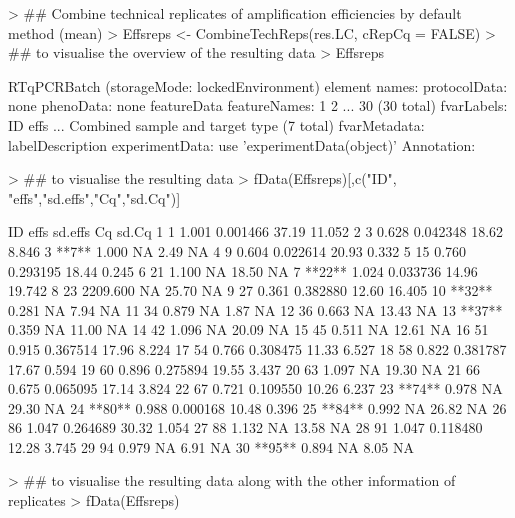 \documentclass[11pt]{article}
\begin{document}
\begin{Schunk}
\begin{Sinput}
> ## Combine technical replicates of amplification efficiencies by default method (mean)
> Effsreps <- CombineTechReps(res.LC, cRepCq = FALSE)
> ## to visualise the overview of the resulting data
> Effsreps 
\end{Sinput}
\begin{Soutput}
RTqPCRBatch (storageMode: lockedEnvironment)
  element names:  
protocolData: none
phenoData: none
featureData
  featureNames: 1 2 ... 30 (30 total)
  fvarLabels: ID effs ... Combined sample and target type (7 total)
  fvarMetadata: labelDescription
experimentData: use 'experimentData(object)'
Annotation:  
\end{Soutput}
\begin{Sinput}
> ## to visualise the resulting data
> fData(Effsreps)[,c("ID", "effs","sd.effs","Cq","sd.Cq")] 
\end{Sinput}
\begin{Soutput}
       ID     effs  sd.effs    Cq  sd.Cq
1       1    1.001 0.001466 37.19 11.052
2       3    0.628 0.042348 18.62  8.846
3   **7**    1.000       NA  2.49     NA
4       9    0.604 0.022614 20.93  0.332
5      15    0.760 0.293195 18.44  0.245
6      21    1.100       NA 18.50     NA
7  **22**    1.024 0.033736 14.96 19.742
8      23 2209.600       NA 25.70     NA
9      27    0.361 0.382880 12.60 16.405
10 **32**    0.281       NA  7.94     NA
11     34    0.879       NA  1.87     NA
12     36    0.663       NA 13.43     NA
13 **37**    0.359       NA 11.00     NA
14     42    1.096       NA 20.09     NA
15     45    0.511       NA 12.61     NA
16     51    0.915 0.367514 17.96  8.224
17     54    0.766 0.308475 11.33  6.527
18     58    0.822 0.381787 17.67  0.594
19     60    0.896 0.275894 19.55  3.437
20     63    1.097       NA 19.30     NA
21     66    0.675 0.065095 17.14  3.824
22     67    0.721 0.109550 10.26  6.237
23 **74**    0.978       NA 29.30     NA
24 **80**    0.988 0.000168 10.48  0.396
25 **84**    0.992       NA 26.82     NA
26     86    1.047 0.264689 30.32  1.054
27     88    1.132       NA 13.58     NA
28     91    1.047 0.118480 12.28  3.745
29     94    0.979       NA  6.91     NA
30 **95**    0.894       NA  8.05     NA
\end{Soutput}
\begin{Sinput}
> ## to visualise the resulting data along with the other information of replicates
> fData(Effsreps) 
\end{Sinput}
\begin{Soutput}

\end{Soutput}
\end{Schunk}
\end{document}
